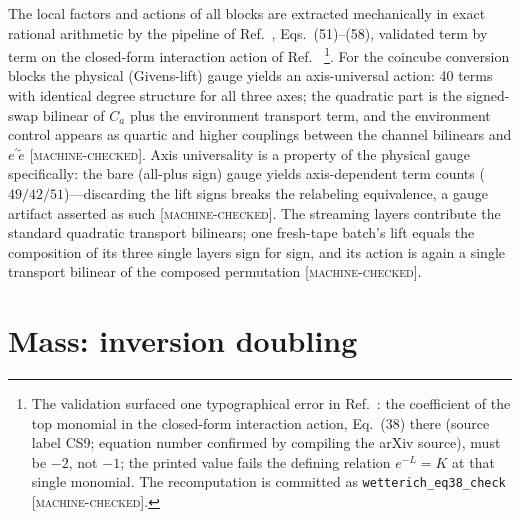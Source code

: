 \documentclass[aps,prd,twocolumn,superscriptaddress,nofootinbib,floatfix]{revtex4-2}
\newcommand{\evM}{\textnormal{\textsc{[machine-checked]}}}
\begin{document}
The local factors and actions of all blocks are extracted mechanically in
exact rational arithmetic by the pipeline of
Ref.~\cite{Wetterich2022}, Eqs.~(51)--(58), validated term by term on the
closed-form interaction action of Ref.~\cite{Wetterich2022b}%
\footnote{The validation surfaced one typographical error in
Ref.~\cite{Wetterich2022b}: the coefficient of the top monomial in the
closed-form interaction action, Eq.~(38) there (source label CS9;
equation number confirmed by compiling the arXiv source), must be $-2$,
not $-1$; the printed value fails the defining relation $e^{-L}=K$ at
that single monomial. The recomputation is committed as
\texttt{wetterich\_eq38\_check} \evM{}.}. For the coincube conversion blocks the physical (Givens-lift)
gauge yields an axis-universal action: 40 terms with identical degree
structure for all three axes; the quadratic part is the signed-swap
bilinear of $C_a$ plus the environment transport term, and the
environment control appears as quartic and higher couplings between the
channel bilinears and $e^\prime\tilde e$ \evM{}. Axis universality is a
property of the physical gauge specifically: the bare (all-plus sign)
gauge yields axis-dependent term counts ($49/42/51$)---discarding the
lift signs breaks the relabeling equivalence, a gauge artifact asserted
as such \evM{}. The streaming layers contribute the standard quadratic
transport bilinears; one fresh-tape batch's lift equals the composition
of its three single layers sign for sign, and its action is again a
single transport bilinear of the composed permutation \evM{}.

\section{Mass: inversion doubling}
\label{sec:mass}
\end{document}
